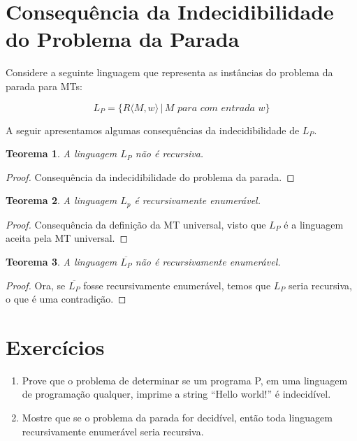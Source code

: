 \documentclass[a4paper]{article}
\newtheorem{Theorem}{Teorema}
\theoremstyle{definition}
\begin{document}
  \section{Consequência da Indecidibilidade do Problema da Parada}

  Considere a seguinte linguagem que representa as instâncias do problema da
  parada para MTs:

  \[
    L_P = \{R\langle M,w \rangle\,|\,M\textit{ para com entrada }w\}
  \]

  A seguir apresentamos algumas consequências da indecidibilidade de $L_P$.

  \begin{Theorem}
    A linguagem $L_P$ não é recursiva.
  \end{Theorem}
  \begin{proof}
    Consequência da indecidibilidade do problema da parada.
  \end{proof}

  \begin{Theorem}
    A linguagem $L_p$ é recursivamente enumerável.
  \end{Theorem}
  \begin{proof}
    Consequência da definição da MT universal, visto que $L_P$ é a linguagem
    aceita pela MT universal.
  \end{proof}

  \begin{Theorem}
    A linguagem $\overline{L_P}$ não é recursivamente enumerável.
  \end{Theorem}
  \begin{proof}
    Ora, se $\overline{L_P}$ fosse recursivamente enumerável, temos que $L_P$
    seria recursiva, o que é uma contradição.
  \end{proof}
  
  \section{Exercícios}

  \begin{enumerate}
     \item Prove que o problema de determinar se um programa P, em uma linguagem
       de programação qualquer, imprime a string ``Hello world!'' é indecidível.
     \item Mostre que se o problema da parada for decidível, então toda
       linguagem recursivamente enumerável seria recursiva.
  \end{enumerate}
\end{document}
